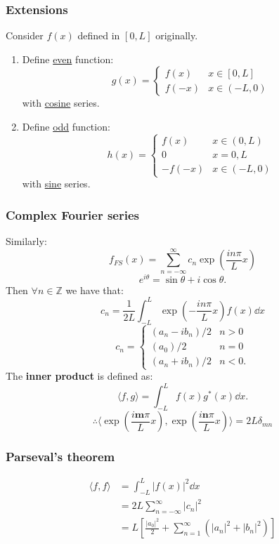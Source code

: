 \documentclass{article}
\begin{document}
\begin{multicols}{3}
\subsubsection*{Extensions}
Consider $f(x)$ defined in $[0,L]$ originally.
\begin{enumerate}
    \item Define \underline{even} function:
    $$g(x)=
    \left\{
    \begin{array}{ll}
        f(x)  & \mbox{} x\in[0,L] \\
        f(-x) & \mbox{} x\in(-L,0)
    \end{array}
    \right.$$
    with \underline{cosine} series.
    
    \item Define \underline{odd} function:
    $$h(x)=
    \left\{
    \begin{array}{ll}
        f(x)  & \mbox{} x\in(0,L) \\
        0 & x=0,L \\
        -f(-x) & \mbox{} x\in(-L,0)
    \end{array}
    \right.$$
    with \underline{sine} series.
\end{enumerate}

\subsubsection*{Complex Fourier series}
Similarly:
$$f_{FS}(x)=\sum_{n=-\infty}^{\infty} c_n \exp\left(\frac{in\pi}{L} x\right)$$
$$e^{i\theta}=\sin{\theta}+i\cos{\theta}.$$
Then $\forall n\in\mathbb{Z}$ we have that:
$$c_n=\frac{1}{2L}\int_{-L}^{L} \exp\left(-\frac{in\pi}{L} x\right) f(x)\dd x$$
\[ c_n = \begin{cases} 
    (a_n - ib_n)/2 & n > 0 \\
    (a_0)/2 & n = 0 \\
    (a_n + ib_n)/2 & n < 0.
\end{cases}\]
The \textbf{inner product} is defined as:
$$\langle f, g\rangle=\int_{-L}^{L} f(x)g^*(x)\dd x.$$
$$\therefore\langle \exp\left(\frac{i\boldsymbol{m}\pi}{L} x\right),
\exp\left(\frac{i\boldsymbol{n}\pi}{L} x\right)\rangle
=2L\delta_{mn}$$

\subsubsection*{Parseval's theorem}
\begin{align*}
    \langle f, f\rangle
    &=\int_{-L}^{L} |f(x)|^2 \dd x \\
    &=2L\sum_{n=-\infty}^{\infty} |c_n|^2 \\
    &=L\left[ \frac{|a_0|^2}{2} + \sum_{n=1}^{\infty} (|a_n|^2 + |b_n|^2)\right]
\end{align*}


\end{multicols}
\end{document}
